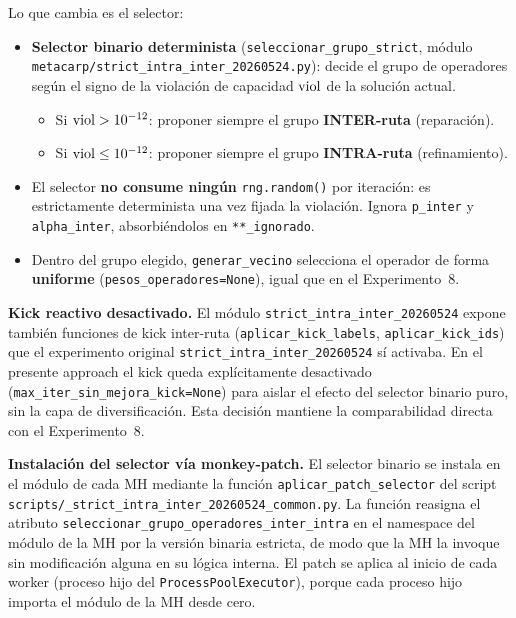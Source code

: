 \noindent Lo que cambia es el selector:

\begin{itemize}
\item \textbf{Selector binario determinista}
  (\texttt{seleccionar\_grupo\_strict}, módulo
  \texttt{metacarp/strict\_intra\_inter\_20260524.py}): decide el
  grupo de operadores según el signo de la violación de capacidad
  $\mathrm{viol}$ de la solución actual.
  \begin{itemize}
  \item Si $\mathrm{viol} > 10^{-12}$: proponer siempre el grupo
    \textbf{INTER-ruta} (reparación).
  \item Si $\mathrm{viol} \le 10^{-12}$: proponer siempre el grupo
    \textbf{INTRA-ruta} (refinamiento).
  \end{itemize}
\item El selector \textbf{no consume ningún} \texttt{rng.random()} por
  iteración: es estrictamente determinista una vez fijada la
  violación. Ignora \texttt{p\_inter} y \texttt{alpha\_inter},
  absorbiéndolos en \texttt{**\_ignorado}.
\item Dentro del grupo elegido, \texttt{generar\_vecino} selecciona el
  operador de forma \textbf{uniforme} (\texttt{pesos\_operadores=None}),
  igual que en el Experimento~8.
\end{itemize}

\medskip
\noindent\textbf{Kick reactivo desactivado.} El módulo
\texttt{strict\_intra\_inter\_20260524} expone también funciones de
kick inter-ruta (\texttt{aplicar\_kick\_labels},
\texttt{aplicar\_kick\_ids}) que el experimento original
\texttt{strict\_intra\_inter\_20260524} sí activaba. En el presente
approach el kick queda explícitamente desactivado
(\texttt{max\_iter\_sin\_mejora\_kick=None}) para aislar el efecto del
selector binario puro, sin la capa de diversificación. Esta decisión
mantiene la comparabilidad directa con el Experimento~8.

\medskip
\noindent\textbf{Instalación del selector vía monkey-patch.}
El selector binario se instala en el módulo de cada MH mediante la
función \texttt{aplicar\_patch\_selector} del script
\texttt{scripts/\_strict\_intra\_inter\_20260524\_common.py}. La
función reasigna el atributo
\texttt{seleccionar\_grupo\_operadores\_inter\_intra} en el namespace
del módulo de la MH por la versión binaria estricta, de modo que la
MH la invoque sin modificación alguna en su lógica interna. El patch
se aplica al inicio de cada worker (proceso hijo del
\texttt{ProcessPoolExecutor}), porque cada proceso hijo importa el
módulo de la MH desde cero.

